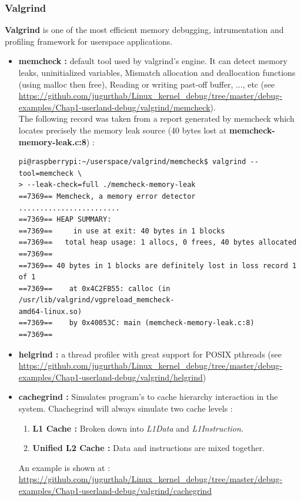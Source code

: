 \subsubsection{Valgrind}
\textbf{Valgrind} is one of the most efficient memory debugging, intrumentation and profiling framework for userspace applications.
\begin{itemize}
	\item \textbf{memcheck : } default tool used by valgrind's engine. It can detect memory leaks, uninitialized variables, Mismatch allocation and deallocation functions (using malloc then free), Reading or writing past-off buffer, ..., etc (see {\color{blue}\url{https://github.com/jugurthab/Linux_kernel_debug/tree/master/debug-examples/Chap1-userland-debug/valgrind/memcheck}}).\\
	
The following record was taken from a report generated by memcheck which locates precisely the memory leak source (40 bytes lost at \textbf{memcheck-memory-leak.c:8}) :

		\begin{lstlisting}[style=BashInputStyle]
pi@raspberrypi:~/userspace/valgrind/memcheck$ valgrind --tool=memcheck \
> --leak-check=full ./memcheck-memory-leak 
==7369== Memcheck, a memory error detector
........................
==7369== HEAP SUMMARY:
==7369==     in use at exit: 40 bytes in 1 blocks
==7369==   total heap usage: 1 allocs, 0 frees, 40 bytes allocated
==7369== 
==7369== 40 bytes in 1 blocks are definitely lost in loss record 1 of 1
==7369==    at 0x4C2FB55: calloc (in /usr/lib/valgrind/vgpreload_memcheck-
amd64-linux.so)
==7369==    by 0x40053C: main (memcheck-memory-leak.c:8)
==7369== 
		\end{lstlisting}
	
	\item \textbf{helgrind : } a thread profiler with great support for POSIX pthreads (see {\color{blue} \url{https://github.com/jugurthab/Linux_kernel_debug/tree/master/debug-examples/Chap1-userland-debug/valgrind/helgrind}})	
	
	\item \textbf{cachegrind : }
	Simulates program's to cache hierarchy interaction in the system. Chachegrind will always simulate two cache levels :
		\begin{enumerate}
			\item {\textbf{L1 Cache :} Broken down into \emph{L1Data} and \emph{L1Instruction}.}
			\item {\textbf{Unified L2 Cache :} Data and instructions are mixed together.}
		\end{enumerate}			
An example is shown at : {\color{blue}\url{https://github.com/jugurthab/Linux_kernel_debug/tree/master/debug-examples/Chap1-userland-debug/valgrind/cachegrind}}
	

\end{itemize}
